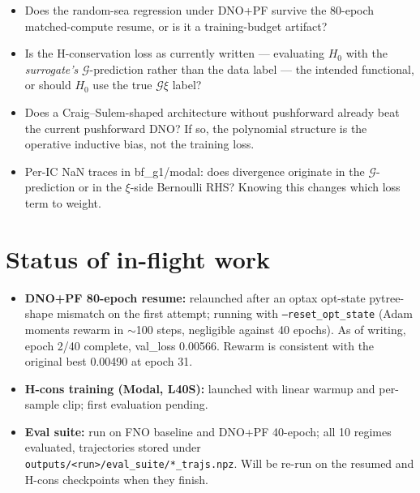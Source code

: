 \documentclass[11pt,letterpaper]{article}
\newcommand{\Gop}{\mathcal{G}}
\begin{document}
\begin{itemize}[leftmargin=1.3em,itemsep=3pt]
  \item Does the random-sea regression under DNO+PF survive the 80-epoch
        matched-compute resume, or is it a training-budget artifact?
  \item Is the H-conservation loss as currently written --- evaluating
        $H_{0}$ with the \emph{surrogate's} $\Gop$-prediction rather
        than the data label --- the intended functional, or should
        $H_{0}$ use the true $\Gop\xi$ label?
  \item Does a Craig--Sulem-shaped architecture without pushforward
        already beat the current pushforward DNO? If so, the polynomial
        structure is the operative inductive bias, not the training
        loss.
  \item Per-IC NaN traces in bf\_g1/modal: does divergence originate in
        the $\Gop$-prediction or in the $\xi$-side Bernoulli RHS?
        Knowing this changes which loss term to weight.
\end{itemize}

\section{Status of in-flight work}

\begin{itemize}[leftmargin=1.3em,itemsep=2pt]
  \item \textbf{DNO+PF 80-epoch resume:} relaunched after an optax
        opt-state pytree-shape mismatch on the first attempt; running
        with \texttt{--reset\_opt\_state} (Adam moments rewarm in
        $\sim$100 steps, negligible against 40 epochs). As of writing,
        epoch 2/40 complete, val\_loss 0.00566. Rewarm is consistent
        with the original best 0.00490 at epoch 31.
  \item \textbf{H-cons training (Modal, L40S):} launched with linear
        warmup and per-sample clip; first evaluation pending.
  \item \textbf{Eval suite:} run on FNO baseline and DNO+PF
        40-epoch; all 10 regimes evaluated, trajectories stored under
        \texttt{outputs/<run>/eval\_suite/*\_trajs.npz}. Will be re-run
        on the resumed and H-cons checkpoints when they finish.
\end{itemize}

\end{document}

